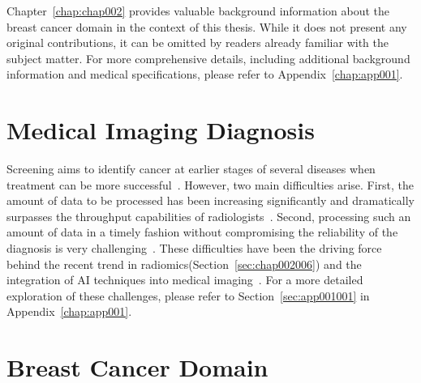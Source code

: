 \clearpage
\label{chap:chap002}

Chapter~\ref{chap:chap002} provides valuable background information about the breast cancer domain in the context of this thesis.
While it does not present any original contributions, it can be omitted by readers already familiar with the subject matter.
For more comprehensive details, including additional background information and medical specifications, please refer to Appendix~\ref{chap:app001}.

\section{Medical Imaging Diagnosis}
\label{sec:chap002001}

Screening aims to identify cancer at earlier stages of several diseases when treatment can be more successful~\cite{McKinney2020}.
However, two main difficulties arise.
First, the amount of data to be processed has been increasing significantly and dramatically surpasses the throughput capabilities of radiologists~\cite{HANNA20181709}.
Second, processing such an amount of data in a timely fashion without compromising the reliability of the diagnosis is very challenging~\cite{McKinney2020}.
These difficulties have been the driving force behind the recent trend in radiomics\footnotemark[4] (Section~\ref{sec:chap002006}) and the integration of \ac{AI} techniques into medical imaging~\cite{doi:10.1148/radiol.2015151169}.
For a more detailed exploration of these challenges, please refer to Section~\ref{sec:app001001} in Appendix~\ref{chap:app001}.


\section{Breast Cancer Domain}
\label{sec:chap002002}


